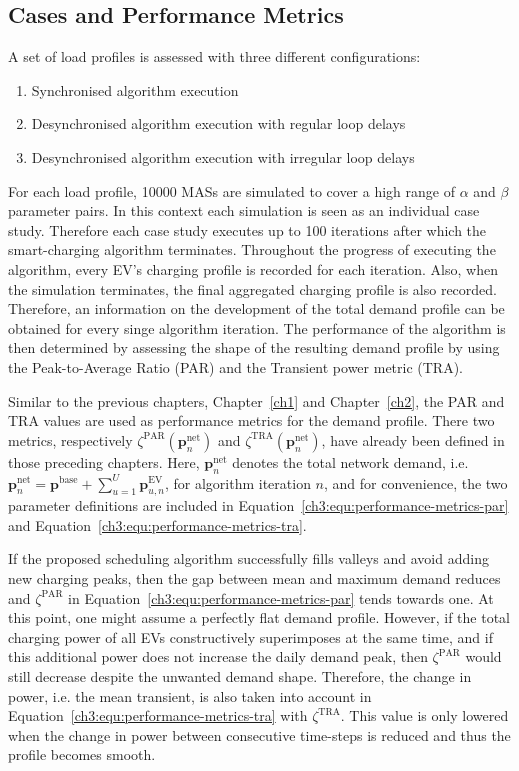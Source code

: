 \subsection{Cases and Performance Metrics}
\label{ch3:subsec:cases-and-metrics}

A set of load profiles is assessed with three different configurations:

\begin{enumerate}
	\item Synchronised algorithm execution
	\item Desynchronised algorithm execution with regular loop delays
	\item Desynchronised algorithm execution with irregular loop delays
\end{enumerate}

For each load profile, 10000 MASs are simulated to cover a high range of $\alpha$ and $\beta$ parameter pairs.
In this context each simulation is seen as an individual case study.
Therefore each case study executes up to 100 iterations after which the smart-charging algorithm terminates.
Throughout the progress of executing the algorithm, every EV's charging profile is recorded for each iteration.
Also, when the simulation terminates, the final aggregated charging profile is also recorded.
Therefore, an information on the development of the total demand profile can be obtained for every singe algorithm iteration.
The performance of the algorithm is then determined by assessing the shape of the resulting demand profile by using the Peak-to-Average Ratio (PAR) and the Transient power metric (TRA).

Similar to the previous chapters, Chapter~\ref{ch1} and Chapter~\ref{ch2}, the PAR and TRA values are used as performance metrics for the demand profile.
There two metrics, respectively $\zeta^\text{PAR}(\textbf{p}^\text{net}_n)$ and $\zeta^\text{TRA}(\textbf{p}^\text{net}_n)$, have already been defined in those preceding chapters.
Here, $\textbf{p}^\text{net}_n$ denotes the total network demand, i.e. $\textbf{p}^\text{net}_n = \textbf{p}^\text{base} + \sum_{u=1}^U \textbf{p}^\text{EV}_{u,n}$, for algorithm iteration $n$, and for convenience, the two parameter definitions are included in Equation~\ref{ch3:equ:performance-metrics-par} and Equation~\ref{ch3:equ:performance-metrics-tra}.



If the proposed scheduling algorithm successfully fills valleys and avoid adding new charging peaks, then the gap between mean and maximum demand reduces and $\zeta^\text{PAR}$ in Equation~\ref{ch3:equ:performance-metrics-par} tends towards one.
At this point, one might assume a perfectly flat demand profile.
However, if the total charging power of all EVs constructively superimposes at the same time, and if this additional power does not increase the daily demand peak, then $\zeta^\text{PAR}$ would still decrease despite the unwanted demand shape.
Therefore, the change in power, i.e. the mean transient, is also taken into account in Equation~\ref{ch3:equ:performance-metrics-tra} with $\zeta^\text{TRA}$.
This value is only lowered when the change in power between consecutive time-steps is reduced and thus the profile becomes smooth.

